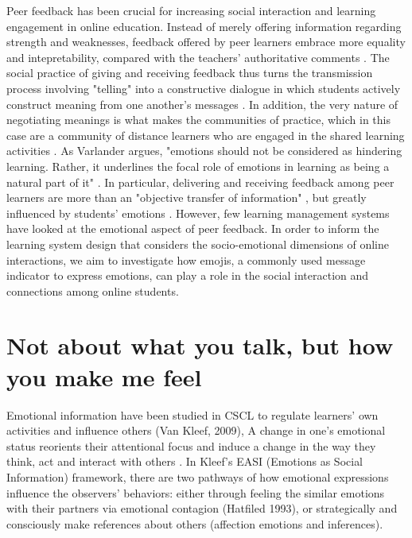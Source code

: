 \documentclass[chi_draft]{sigchi}
\begin{document}
Peer feedback has been crucial for increasing social interaction and learning engagement in online education. Instead of merely offering information regarding strength and weaknesses, feedback offered by peer learners embrace more equality and intepretability, compared with the teachers' authoritative comments . The social practice of giving and receiving feedback thus turns the transmission process involving "telling" into a constructive dialogue in which students actively construct meaning from one another's messages \cite{Juwah2004}. In addition, the very nature of negotiating meanings is what makes the communities of practice, which in this case are a community of distance learners who are engaged in the shared learning activities \cite{Lave1998}. As Varlander argues, "emotions should not be considered as hindering learning. Rather, it underlines the focal role of emotions in learning as being a natural part of it" \cite{Varlander2008}. In particular, delivering and receiving feedback among peer learners are more than an "objective transfer of information" \cite{Jacobs1974,Falchikov2013}, but greatly influenced by students' emotions \cite{Race1996}. However, few learning management systems have looked at the emotional aspect of peer feedback. In order to inform the learning system design that considers the socio-emotional dimensions of online interactions, we aim to investigate how emojis, a commonly used message indicator to express emotions, can play a role in the social interaction and connections among online students. 

\section{Not about what you talk, but how you make me feel}
Emotional information have  been studied in CSCL to regulate learners' own activities and influence others (Van Kleef, 2009), A change in one's emotional status reorients their attentional focus and induce a change in the way they think, act and interact with others \cite{Molinari2016}. In Kleef's EASI (Emotions as Social Information) framework, there are two pathways of how emotional expressions influence the observers’ behaviors: either through feeling the similar emotions with their partners via emotional contagion (Hatfiled 1993), or strategically and consciously make references about others (affection emotions and inferences). 
\end{document}
